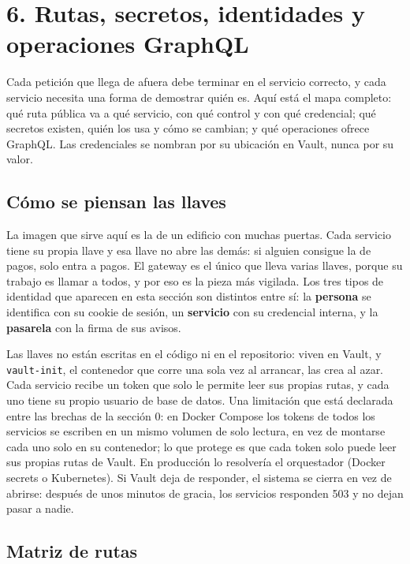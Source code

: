 
\section{6. Rutas, secretos, identidades y operaciones GraphQL}

Cada petición que llega de afuera debe terminar en el servicio correcto, y cada servicio necesita una forma de demostrar quién es. Aquí está el mapa completo: qué ruta pública va a qué servicio, con qué control y con qué credencial; qué secretos existen, quién los usa y cómo se cambian; y qué operaciones ofrece GraphQL. Las credenciales se nombran por su ubicación en Vault, nunca por su valor.


\subsection{Cómo se piensan las llaves}

La imagen que sirve aquí es la de un edificio con muchas puertas. Cada servicio tiene su propia llave y esa llave no abre las demás: si alguien consigue la de pagos, solo entra a pagos. El gateway es el único que lleva varias llaves, porque su trabajo es llamar a todos, y por eso es la pieza más vigilada. Los tres tipos de identidad que aparecen en esta sección son distintos entre sí: la \textbf{persona} se identifica con su cookie de sesión, un \textbf{servicio} con su credencial interna, y la \textbf{pasarela} con la firma de sus avisos.


Las llaves no están escritas en el código ni en el repositorio: viven en Vault, y \texttt{vault-\allowbreak{}init}, el contenedor que corre una sola vez al arrancar, las crea al azar. Cada servicio recibe un token que solo le permite leer sus propias rutas, y cada uno tiene su propio usuario de base de datos. Una limitación que está declarada entre las brechas de la sección 0: en Docker Compose los tokens de todos los servicios se escriben en un mismo volumen de solo lectura, en vez de montarse cada uno solo en su contenedor; lo que protege es que cada token solo puede leer sus propias rutas de Vault. En producción lo resolvería el orquestador (Docker secrets o Kubernetes). Si Vault deja de responder, el sistema se cierra en vez de abrirse: después de unos minutos de gracia, los servicios responden 503 y no dejan pasar a nadie.


\subsection{Matriz de rutas}

